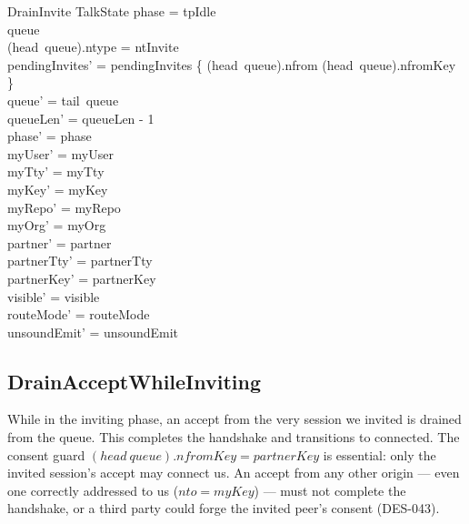 \documentclass[a4paper,10pt,fleqn]{article}
\begin{document}
\begin{schema}{DrainInvite}
  \Delta TalkState
\where
  phase = tpIdle \\
  queue \neq \langle \rangle \\
  (head~queue).ntype = ntInvite \\
  pendingInvites' =
    pendingInvites \oplus \{ (head~queue).nfrom \mapsto (head~queue).nfromKey \} \\
  queue' = tail~queue \\
  queueLen' = queueLen - 1 \\
  phase' = phase \\
  myUser' = myUser \\
  myTty' = myTty \\
  myKey' = myKey \\
  myRepo' = myRepo \\
  myOrg' = myOrg \\
  partner' = partner \\
  partnerTty' = partnerTty \\
  partnerKey' = partnerKey \\
  visible' = visible \\
  routeMode' = routeMode \\
  unsoundEmit' = unsoundEmit
\end{schema}

\subsection{DrainAcceptWhileInviting}

While in the inviting phase, an accept from the very session we invited
is drained from the queue.  This completes the handshake and transitions
to connected.  The consent guard $(head~queue).nfromKey = partnerKey$ is
essential: only the invited session's accept may connect us.  An accept
from any other origin --- even one correctly addressed to us
($nto = myKey$) --- must not complete the handshake, or a third party
could forge the invited peer's consent (DES-043).
\end{document}
